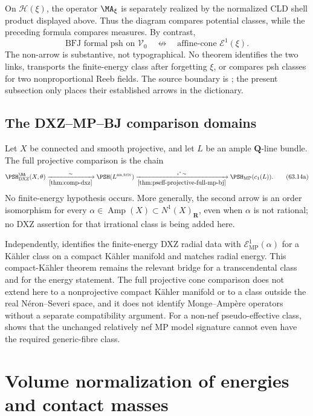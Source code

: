 On $\mathcal H(\xi)$, the operator $\MA_\xi$ is separately realized
by the normalized CLD shell product displayed above.  Thus the diagram
compares potential classes, while the preceding formula compares measures.
By contrast,
\[
 \text{BFJ formal psh on }\mathcal V_0
 \quad\nleftrightarrow\quad
 \text{affine-cone }\mathcal E^1(\xi).
\]
The non-arrow is substantive, not typographical.  No theorem identifies the
two links, transports the finite-energy class after forgetting $\xi$, or
compares psh classes for two nonproportional Reeb fields.  The source boundary is
\cite{Wu22AffineEnergy,Wu24AffineCones}; the present subsection only places
their established arrows in the dictionary.

\subsection{The DXZ--MP--BJ comparison domains}
\label{subsec:dict-dxz-mp-bj}

Let $X$ be connected and smooth projective, and let $L$ be an ample
$\mathbf Q$-line bundle.  The full projective comparison is the chain
\[
 \PSH^{\NA}_{\mathrm{DXZ}}(X,\theta)
 \xrightarrow[\Cref{thm:comp-dxz}]{\ \sim\ }
 \PSH(L^{\mathrm{an,triv}})
 \xrightarrow[\Cref{thm:pseff-projective-full-mp-bj}]
             {\ \iota^*\,\sim\ }
 \PSH_{\mathrm{MP}}(c_1(L)).
\tag{63.14a}\label{eq:dict-full-projective-chain}
\]
No finite-energy hypothesis occurs.  More generally, the second arrow is
an order isomorphism for every
$\alpha\in\operatorname{Amp}(X)\subset N^1(X)_{\mathbf R}$, even when
$\alpha$ is not rational; no DXZ assertion for that irrational class is
being added here.

Independently,  identifies the
finite-energy DXZ radial data with $\mathcal E^1_{\mathrm{MP}}(\alpha)$
for a K\"ahler class on a compact K\"ahler manifold and matches radial
energy.  This compact-K\"ahler theorem remains the relevant bridge for a
transcendental class and for the energy statement.  The full projective
cone comparison does not extend here to a nonprojective compact K\"ahler
manifold or to a class outside the real N\'eron--Severi space, and it does
not identify Monge--Amp\`ere operators without a separate compatibility
argument.  For a non-nef pseudo-effective class,
 shows that the unchanged
relatively nef MP model signature cannot even have the required
generic-fibre class.

\section{Volume normalization of energies and contact masses}
\label{sec:dict-volume-normalization}

